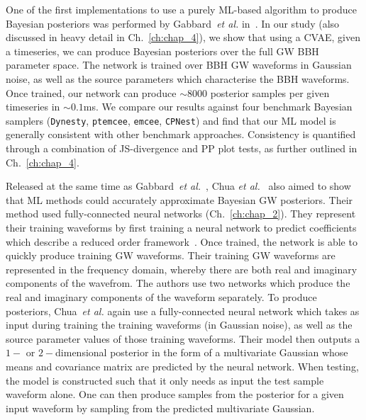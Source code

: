 %
%
One of the first implementations to use a purely \ac{ML}-based 
algorithm to produce Bayesian posteriors was performed 
by Gabbard~\textit{et al.} 
in~\cite{1909.06296}. In our study (also discussed in heavy detail in 
Ch.~\ref{ch:chap_4}), we show that using a \ac{CVAE}, given a timeseries, 
we can produce Bayesian posteriors over the full \ac{GW} 
\ac{BBH} parameter space. 
The network is trained over \ac{BBH} \ac{GW} waveforms in Gaussian noise, 
as well as the source parameters which characterise the \ac{BBH} waveforms. 
Once trained, our network can produce $\sim 8000$ posterior samples 
per given timeseries in $\sim 0.1$ms. We compare our results against 
four benchmark Bayesian samplers (\texttt{Dynesty}, \texttt{ptemcee}, 
\texttt{emcee}, \texttt{CPNest}) and find that our \ac{ML} model is 
generally consistent with other benchmark approaches. Consistency 
is quantified through a combination of \ac{JS}-divergence and \ac{PP} 
plot tests, as further outlined in Ch.~\ref{ch:chap_4}.

%
% 
Released at the same time as Gabbard~\textit{et al.}~\cite{1909.06296}, 
Chua \textit{et al.}~\cite{2019arXiv190905966C} also aimed to show that 
\ac{ML} methods could accurately 
approximate Bayesian \ac{GW} posteriors. Their method used 
fully-connected neural networks (Ch.~\ref{ch:chap_2}). They represent 
their training waveforms by first training a neural network to 
predict coefficients which describe a reduced order
framework~\cite{PhysRevLett.122.211101}. Once trained, the 
network is able to quickly produce training \ac{GW} waveforms. 
Their training \ac{GW} waveforms are represented in 
the frequency domain, whereby there are both real and imaginary 
components of the wavefrom. The authors use  
two networks which produce the real and imaginary components of the 
waveform separately. To produce posteriors, 
Chua~\textit{et al.} again use a fully-connected neural 
network which takes as input during training the 
training waveforms (in Gaussian noise), as well as the source 
parameter values of those training waveforms. Their model then outputs 
a $1-$ or $2-$dimensional posterior in the form of a multivariate 
Gaussian whose means and covariance matrix are predicted by 
the neural network. When testing, the model is constructed such that 
it only needs as input the test sample waveform alone. One can then 
produce samples from the posterior for a given input waveform by 
sampling from the predicted multivariate Gaussian. 

